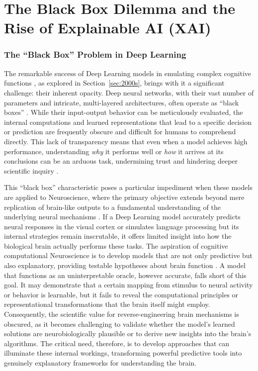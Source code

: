 \part{The Black Box Dilemma and the Rise of Explainable AI (XAI)}

\section{The ``Black Box'' Problem in Deep Learning}

The remarkable success of Deep Learning models in emulating complex cognitive functions \cite{lecun2015deep}, as explored in Section~\ref{sec:2000s}, brings with it a significant challenge: their inherent opacity. Deep neural networks, with their vast number of parameters and intricate, multi-layered architectures, often operate as ``black boxes'' \cite{doshi2017towards}. While their input-output behavior can be meticulously evaluated, the internal computations and learned representations that lead to a specific decision or prediction are frequently obscure and difficult for humans to comprehend directly. This lack of transparency means that even when a model achieves high performance, understanding \textit{why} it performs well or \textit{how} it arrives at its conclusions can be an arduous task, undermining trust and hindering deeper scientific inquiry \cite{ribeiro2016why, miller2019explanation}.

This ``black box'' characteristic poses a particular impediment when these models are applied to Neuroscience, where the primary objective extends beyond mere replication of brain-like outputs to a fundamental understanding of the underlying neural mechanisms \cite{richards2019deep, savage2019how}. If a Deep Learning model accurately predicts neural responses in the visual cortex \cite{yamins2016using} or simulates language processing \cite{caucheteux2022brains} but its internal strategies remain inscrutable, it offers limited insight into how the biological brain actually performs these tasks. The aspiration of cognitive computational Neuroscience is to develop models that are not only predictive but also explanatory, providing testable hypotheses about brain function \cite{kriegeskorte2018cognitive}. A model that functions as an uninterpretable oracle, however accurate, falls short of this goal. It may demonstrate that a certain mapping from stimulus to neural activity or behavior is learnable, but it fails to reveal the computational principles or representational transformations that the brain itself might employ. Consequently, the scientific value for reverse-engineering brain mechanisms is obscured, as it becomes challenging to validate whether the model's learned solutions are neurobiologically plausible or to derive new insights into the brain's algorithms. The critical need, therefore, is to develop approaches that can illuminate these internal workings, transforming powerful predictive tools into genuinely explanatory frameworks for understanding the brain.


